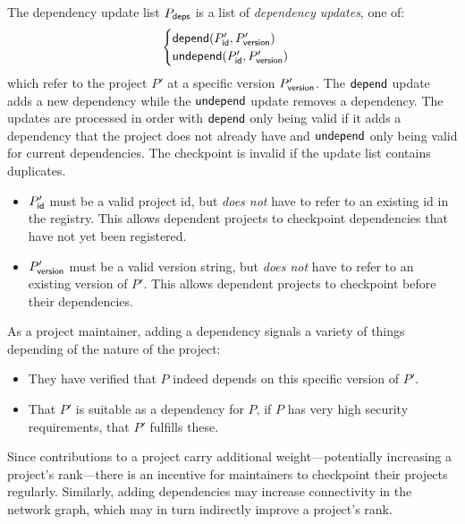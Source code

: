 The dependency update list $P_{\mathsf{deps}}$ is a list of \emph{dependency
  updates}, one of:
\[
    \begin{cases}
        \mathsf{depend}(P'_{\mathsf{id}}, P'_{\mathsf{version}}) \\
        \mathsf{undepend}(P'_{\mathsf{id}}, P'_{\mathsf{version}})
    \end{cases}
\]
which refer to the project $P'$ at a specific version $P'_{\mathsf{version}}$.
The $\mathsf{depend}$ update adds a new dependency while the $\mathsf{undepend}$ update removes
a dependency. The updates are processed in order with $\mathsf{depend}$ only being
valid if it adds a dependency that the project does not already have and
$\mathsf{undepend}$ only being valid for current dependencies. The checkpoint is
invalid if the update list contains duplicates.


\bigskip
\validation
\begin{itemize}
    \item $P'_{\mathsf{id}}$ must be a valid project id, but \emph{does not}
        have to refer to an existing id in the registry. This allows dependent
        projects to checkpoint dependencies that have not yet been registered.
    \item $P'_{\mathsf{version}}$ must be a valid version string, but \emph{does not}
        have to refer to an existing version of $P'$. This allows dependent projects
        to checkpoint before their dependencies.
\end{itemize}
As a project maintainer, adding a dependency signals a variety of things
depending of the nature of the project:
\begin{itemize}
\item They have verified that $P$ indeed depends on this specific
  version of $P'$.
\item That $P'$ is suitable as a dependency for $P$, \eg{} if $P$ has
  very high security requirements, that $P'$ fulfills these.
\end{itemize}
\noindent Since contributions to a project carry additional
weight---potentially increasing a project's rank---there is an incentive
for maintainers to checkpoint their projects regularly.  Similarly, adding
dependencies may increase connectivity in the network graph, which may in turn
indirectly improve a project's rank.

